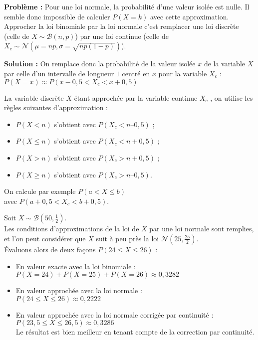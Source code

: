 \documentclass[a4paper,11pt]{article} \usepackage{FBarticle} \mapage{831}{Probabilités 2} %
\begin{document}
\begin{multicols}{2}
\textbf{Problème : } Pour une loi normale, la probabilité d’une valeur isolée est nulle. Il semble donc impossible de
calculer $P(X = k)$ avec cette approximation. \\
Approcher la loi binomiale par la loi normale c’est remplacer une loi discrète (celle de $X\sim\mathcal{B}(n,p)$) par une loi
continue (celle de $X_c\sim\mathcal{N}(\mu=np,\sigma=\sqrt{np(1-p)})$).\par
\textbf{Solution : }On remplace donc la probabilité de la valeur isolée $x$ de la
variable $X$ par celle d’un intervalle de longueur $1$ centré en $x$
pour la variable $X_c$ :\\
$P(X = x) \approx P(x -0,5 < X_c < x + 0,5)$\par
{}\par
\prop La variable discrète $X$ étant approchée par la variable continue $X_c$ , on utilise les règles suivantes d’approximation :
\begin{itemize}
\item $P(X < n)$ s’obtient avec $P(X_c < n – 0,5)$ ;
\item $P(X \leq n)$ s’obtient avec $P(X_c < n + 0,5)$ ;
\item $P(X > n)$ s’obtient avec $P(X_c > n + 0,5)$ ;
\item $P(X \geq n)$ s’obtient avec $P(X_c > n – 0,5)$.
\end{itemize}
On calcule par exemple $P(a < X \leq b)$ \\ avec $P(a + 0,5 < X_c < b + 0,5)$.\par
\exem \par
Soit $X\sim\mathcal{B}\left(50, \frac{1}{2}\right)$.\\
Les conditions d'approximations de la loi de $X$ 
par une loi normale sont remplies, et l'on peut considérer que $X$ suit à peu près la loi $\mathcal{N}\left(25, \frac{25}{2}\right)$.\\
Évaluons alors de deux façons $P(24 \leq X \leq 26)$ :
\begin{itemize}
\item En valeur exacte avec la loi binomiale :\\
$P(X = 24) + P(X = 25) + P(X = 26) \approx 0,3282$ 
\item En valeur approchée avec la loi normale :\\
$P(24 \leq X \leq 26) \approx 0,2222$
\item En valeur approchée avec la loi normale corrigée par continuité :\\
$P(23,5 \leq X \leq 26,5) \approx 0,3286$\\
Le résultat est bien meilleur en tenant compte de la correction par continuité.
\end{itemize}


\end{multicols}
\end{document}
